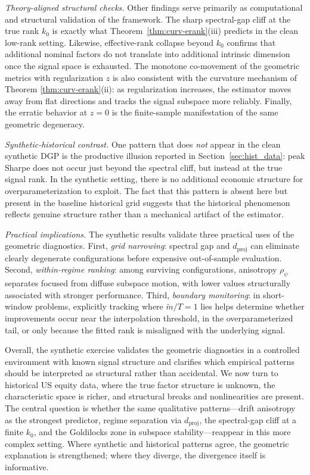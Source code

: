 \documentclass[11pt,letterpaper]{article}
\newcommand{\dproj}{d_{\mathrm{proj}}}
\begin{document}
\medskip
\noindent\textit{Theory-aligned structural checks.}
Other findings serve primarily as computational and structural validation of the framework. The sharp spectral-gap cliff at the true rank $k_0$ is exactly what Theorem~\ref{thm:curv-erank}(iii) predicts in the clean low-rank setting. Likewise, effective-rank collapse beyond $k_0$ confirms that additional nominal factors do not translate into additional intrinsic dimension once the signal space is exhausted. The monotone co-movement of the geometric metrics with regularization $z$ is also consistent with the curvature mechanism of Theorem \ref{thm:curv-erank}(ii): as regularization increases, the estimator moves away from flat directions and tracks the signal subspace more reliably. Finally, the erratic behavior at $z=0$ is the finite-sample manifestation of the same geometric degeneracy.

\medskip
\noindent\textit{Synthetic-historical contrast.}
One pattern that does \emph{not} appear in the clean synthetic DGP is the productive illusion reported in Section~\ref{sec:hist_data}: peak Sharpe does not occur just beyond the spectral cliff, but instead at the true signal rank. In the synthetic setting, there is no additional economic structure for overparameterization to exploit. The fact that this pattern is absent here but present in the baseline historical grid suggests that the historical phenomenon reflects genuine structure rather than a mechanical artifact of the estimator.

\medskip
\noindent\textit{Practical implications.}
The synthetic results validate three practical uses of the geometric diagnostics. First, \emph{grid narrowing}: spectral gap and $\dproj$ can eliminate clearly degenerate configurations before expensive out-of-sample evaluation. Second, \emph{within-regime ranking}: among surviving configurations, anisotropy $\rho_\psi$ separates focused from diffuse subspace motion, with lower values
structurally associated with stronger performance. Third, \emph{boundary monitoring}: in short-window problems, explicitly tracking where $\tilde m/T=1$ lies helps determine whether improvements occur near the interpolation threshold, in the overparameterized tail, or only because the fitted rank is misaligned with the underlying signal.

Overall, the synthetic exercise validates the geometric diagnostics in a controlled environment with known signal structure and clarifies which empirical patterns should be interpreted as structural rather than accidental. We now turn to historical US equity data, where the true factor structure is unknown, the characteristic space is richer, and structural breaks and nonlinearities are present. The central question is whether the same qualitative patterns---drift anisotropy as the strongest predictor, regime separation via $\dproj$, the
spectral-gap cliff at a finite $k_0$, and the Goldilocks zone in subspace stability---reappear in this more complex setting. Where synthetic and historical patterns agree, the geometric explanation is strengthened; where they diverge, the divergence itself is informative.
\end{document}
